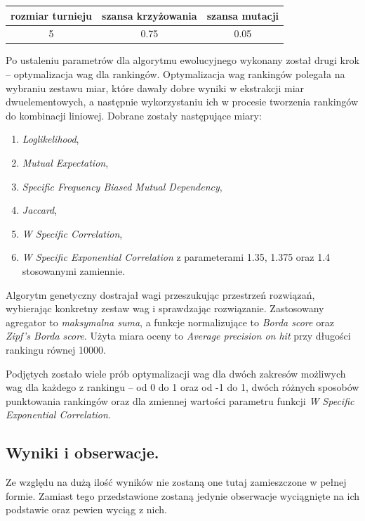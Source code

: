 \documentclass[11pt,a4paper]{llncs}
\begin{document}
\begin{table}[h!]
\centering
\begin{tabular}{ c | c | c }
	\toprule
	rozmiar turnieju & szansa krzyżowania & szansa mutacji \\
	\midrule
	5 & 0.75 & 0.05\\ 
	\bottomrule
\end{tabular}
\end{table}


Po ustaleniu parametrów dla algorytmu ewolucyjnego wykonany został drugi krok -- optymalizacja wag dla rankingów.
Optymalizacja wag rankingów polegała na wybraniu zestawu miar, które dawały dobre wyniki w ekstrakcji miar dwuelementowych, a następnie wykorzystaniu ich w procesie tworzenia rankingów do kombinacji liniowej.
Dobrane zostały następujące miary:
\begin{enumerate}
	\item \emph{Loglikelihood},
	\item \emph{Mutual Expectation},
	\item \emph{Specific Frequency Biased Mutual Dependency},
	\item \emph{Jaccard},
	\item \emph{W Specific Correlation},
	\item \emph{W Specific Exponential Correlation} z parameterami 1.35, 1.375 oraz 1.4 stosowanymi zamiennie.
\end{enumerate}


Algorytm genetyczny dostrajał wagi przeszukując przestrzeń rozwiązań, wybierając konkretny zestaw wag i sprawdzając rozwiązanie.
Zastosowany agregator to \emph{maksymalna suma}, a funkcje normalizujące to \emph{Borda score} oraz \emph{Zipf's Borda score}.
Użyta miara oceny to \emph{Average precision on hit} przy długości rankingu równej 10000.


Podjętych zostało wiele prób optymalizacji wag dla dwóch zakresów możliwych wag dla każdego z rankingu -- od 0 do 1 oraz od -1 do 1, dwóch różnych sposobów punktowania rankingów oraz dla zmiennej wartości parametru funkcji \emph{W Specific Exponential Correlation}.


\subsection{Wyniki i obserwacje.}
Ze względu na dużą ilość wyników nie zostaną one tutaj zamieszczone w pełnej formie.
Zamiast tego przedstawione zostaną jedynie obserwacje wyciągnięte na ich podstawie oraz pewien wyciąg z nich.
\end{document}
